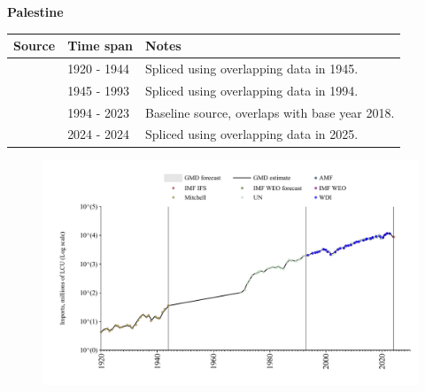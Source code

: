 \documentclass[12pt,a4paper,landscape]{article}
\begin{document}
\begin{adjustbox}{max totalsize={\paperwidth}{\paperheight},center}
\begin{minipage}[t][\textheight][t]{\textwidth}
\vspace*{0.5cm}
{}
\begin{center}
{\Large\bfseries Palestine}
\end{center}
\vspace{0.5cm}
\begin{table}[H]
\centering
\small
\begin{tabular}{|l|l|l|}
\hline
\textbf{Source} & \textbf{Time span} & \textbf{Notes} \\
\hline
\rowcolor{white}\cite{Mitchell}& 1920 - 1944 &Spliced using overlapping data in 1945.\\
\rowcolor{lightgray}\cite{UN}& 1945 - 1993 &Spliced using overlapping data in 1994.\\
\rowcolor{white}\cite{WDI}& 1994 - 2023 &Baseline source, overlaps with base year 2018.\\
\rowcolor{lightgray}\cite{IMF_IFS}& 2024 - 2024 &Spliced using overlapping data in 2025.\\
\hline
\end{tabular}
\end{table}
\begin{figure}[H]
\centering
\includegraphics[width=\textwidth,height=0.6\textheight,keepaspectratio]{graphs/PSE_imports.pdf}
\end{figure}
\end{minipage}
\end{adjustbox}
\end{document}
